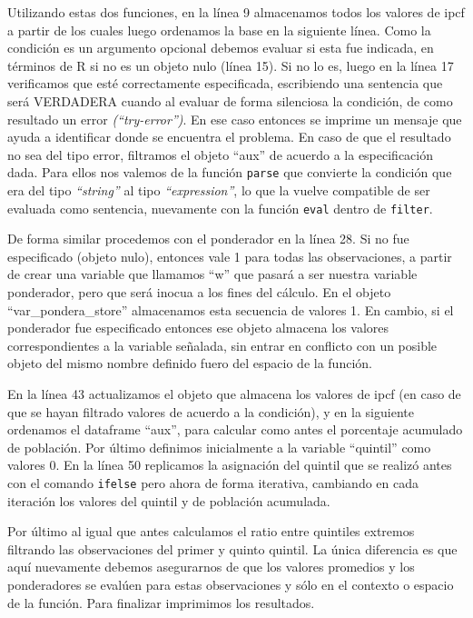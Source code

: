 \documentclass[
]{book}
\begin{document}
Utilizando estas dos funciones, en la línea 9 almacenamos todos los valores de ipcf a partir de los cuales luego ordenamos la base en la siguiente línea. Como la condición es un argumento opcional debemos evaluar si esta fue indicada, en términos de R si no es un objeto nulo (línea 15). Si no lo es, luego en la línea 17 verificamos que esté correctamente especificada, escribiendo una sentencia que será VERDADERA cuando al evaluar de forma silenciosa la condición, de como resultado un error \emph{(``try-error'')}. En ese caso entonces se imprime un mensaje que ayuda a identificar donde se encuentra el problema. En caso de que el resultado no sea del tipo error, filtramos el objeto ``aux'' de acuerdo a la especificación dada. Para ellos nos valemos de la función \texttt{parse} que convierte la condición que era del tipo \emph{``string''} al tipo \emph{``expression''}, lo que la vuelve compatible de ser evaluada como sentencia, nuevamente con la función \texttt{eval} dentro de \texttt{filter}.

De forma similar procedemos con el ponderador en la línea 28. Si no fue especificado (objeto nulo), entonces vale 1 para todas las observaciones, a partir de crear una variable que llamamos ``w'' que pasará a ser nuestra variable ponderador, pero que será inocua a los fines del cálculo. En el objeto ``var\_pondera\_store'' almacenamos esta secuencia de valores 1. En cambio, si el ponderador fue especificado entonces ese objeto almacena los valores correspondientes a la variable señalada, sin entrar en conflicto con un posible objeto del mismo nombre definido fuero del espacio de la función.

En la línea 43 actualizamos el objeto que almacena los valores de ipcf (en caso de que se hayan filtrado valores de acuerdo a la condición), y en la siguiente ordenamos el dataframe ``aux'', para calcular como antes el porcentaje acumulado de población. Por último definimos inicialmente a la variable ``quintil'' como valores 0. En la línea 50 replicamos la asignación del quintil que se realizó antes con el comando \texttt{ifelse} pero ahora de forma iterativa, cambiando en cada iteración los valores del quintil y de población acumulada.

Por último al igual que antes calculamos el ratio entre quintiles extremos filtrando las observaciones del primer y quinto quintil. La única diferencia es que aquí nuevamente debemos asegurarnos de que los valores promedios y los ponderadores se evalúen para estas observaciones y sólo en el contexto o espacio de la función. Para finalizar imprimimos los resultados.
\end{document}
